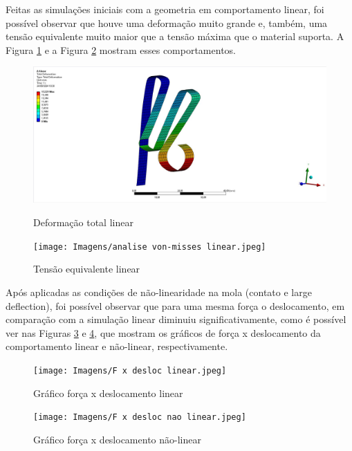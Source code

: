 \documentclass[acronym,symbols]{fei}
\begin{document}
Feitas as simulações iniciais com a geometria em comportamento linear, foi possível observar que houve uma deformação muito grande e, também, uma tensão equivalente muito maior que a tensão máxima que o material suporta. A Figura \ref{fig: deflinear} e a Figura \ref{fig: vonmisseslinear} mostram esses comportamentos.
\begin{figure}[!htb]
    \centering
    \caption{Deformação total linear}
    \includegraphics[width=0.7\linewidth]{Imagens/deformação total linear.jpeg}
    \label{fig: deflinear}
\end{figure}

\begin{figure}[!htb]
    \centering
    \caption{Tensão equivalente linear}
    \texttt{[image: Imagens/analise von-misses linear.jpeg]}
    \label{fig: vonmisseslinear}
\end{figure}

Após aplicadas as condições de não-linearidade na mola (contato e large deflection), foi possível observar que para uma mesma força o deslocamento, em comparação com a simulação linear diminuiu significativamente, como é possível ver nas Figuras \ref{fig: fxd l} e \ref{fig: fxd nl}, que mostram os gráficos de força x deslocamento da comportamento linear e não-linear, respectivamente.



\begin{figure}[!htb]
    \centering
    \caption{Gráfico força x deslocamento linear}
    \texttt{[image: Imagens/F x desloc linear.jpeg]}
    \label{fig: fxd l}
\end{figure}

\begin{figure}[!htb]
    \centering
    \caption{Gráfico força x deslocamento não-linear}
    \texttt{[image: Imagens/F x desloc nao linear.jpeg]}
    \label{fig: fxd nl}
\end{figure}
\end{document}

